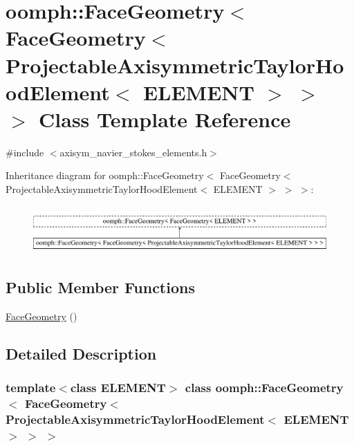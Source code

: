 \hypertarget{classoomph_1_1FaceGeometry_3_01FaceGeometry_3_01ProjectableAxisymmetricTaylorHoodElement_3_01ELEMENT_01_4_01_4_01_4}{}\section{oomph\+:\+:Face\+Geometry$<$ Face\+Geometry$<$ Projectable\+Axisymmetric\+Taylor\+Hood\+Element$<$ E\+L\+E\+M\+E\+NT $>$ $>$ $>$ Class Template Reference}
\label{classoomph_1_1FaceGeometry_3_01FaceGeometry_3_01ProjectableAxisymmetricTaylorHoodElement_3_01ELEMENT_01_4_01_4_01_4}


{\ttfamily \#include $<$axisym\+\_\+navier\+\_\+stokes\+\_\+elements.\+h$>$}

Inheritance diagram for oomph\+:\+:Face\+Geometry$<$ Face\+Geometry$<$ Projectable\+Axisymmetric\+Taylor\+Hood\+Element$<$ E\+L\+E\+M\+E\+NT $>$ $>$ $>$\+:\begin{figure}[H]
\begin{center}
\leavevmode
\includegraphics[height=1.845140cm]{classoomph_1_1FaceGeometry_3_01FaceGeometry_3_01ProjectableAxisymmetricTaylorHoodElement_3_01ELEMENT_01_4_01_4_01_4}
\end{center}
\end{figure}
\subsection*{Public Member Functions}
\begin{DoxyCompactItemize}
\item 
\hyperlink{classoomph_1_1FaceGeometry_3_01FaceGeometry_3_01ProjectableAxisymmetricTaylorHoodElement_3_01ELEMENT_01_4_01_4_01_4_a3ddd45fadbc56d2f734002aa04b8f0bd}{Face\+Geometry} ()
\end{DoxyCompactItemize}


\subsection{Detailed Description}
\subsubsection*{template$<$class E\+L\+E\+M\+E\+NT$>$\newline
class oomph\+::\+Face\+Geometry$<$ Face\+Geometry$<$ Projectable\+Axisymmetric\+Taylor\+Hood\+Element$<$ E\+L\+E\+M\+E\+N\+T $>$ $>$ $>$}

